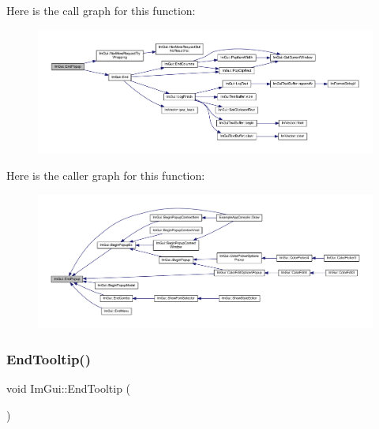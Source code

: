 Here is the call graph for this function\+:
\nopagebreak
\begin{figure}[H]
\begin{center}
\leavevmode
\includegraphics[width=350pt]{namespace_im_gui_aa6a9b5696f2ea7eed7683425fc77b8f2_cgraph}
\end{center}
\end{figure}
Here is the caller graph for this function\+:
\nopagebreak
\begin{figure}[H]
\begin{center}
\leavevmode
\includegraphics[width=350pt]{namespace_im_gui_aa6a9b5696f2ea7eed7683425fc77b8f2_icgraph}
\end{center}
\end{figure}
\mbox{\label{namespace_im_gui_ac8d75c160cfdf43d512f773ca133a1c6}} 
\subsubsection{\texorpdfstring{End\+Tooltip()}{EndTooltip()}}
{\footnotesize\ttfamily void Im\+Gui\+::\+End\+Tooltip (\begin{DoxyParamCaption}{ }\end{DoxyParamCaption})}

